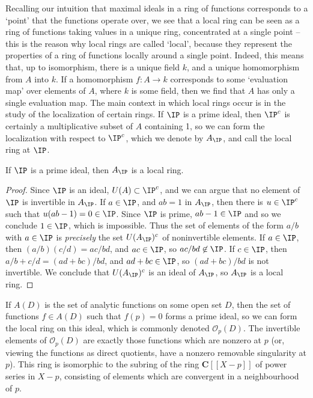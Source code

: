 Recalling our intuition that maximal ideals in a ring of functions corresponds to a `point' that the functions operate over, we see that a local ring can be seen as a ring of functions taking values in a unique ring, concentrated at a single point -- this is the reason why local rings are called `local', because they represent the properties of a ring of functions locally around a single point. Indeed, this means that, up to isomorphism, there is a unique field $k$, and a unique homomorphism from $A$ into $k$. If a homomorphism $f: A \to k$ corresponds to some `evaluation map' over elements of $A$, where $k$ is some field, then we find that $A$ has only a single evaluation map. The main context in which local rings occur is in the study of the localization of certain rings. If $\IP$ is a prime ideal, then $\IP^c$ is certainly a multiplicative subset of $A$ containing 1, so we can form the localization with respect to $\IP^c$, which we denote by $A_{\IP}$, and call the local ring at $\IP$.

\begin{theorem}
    If $\IP$ is a prime ideal, then $A_{\IP}$ is a local ring.
\end{theorem}
\begin{proof}
    Since $\IP$ is an ideal, $U(A) \subset \IP^c$, and we can argue that no element of $\IP$ is invertible in $A_{\IP}$. If $a \in \IP$, and $ab = 1$ in $A_{\IP}$, then there is $u \in \IP^c$ such that $u(ab - 1) = 0 \in \IP$. Since $\IP$ is prime, $ab - 1 \in \IP$ and so we conclude $1 \in \IP$, which is impossible. Thus the set of elements of the form $a/b$ with $a \in \IP$ is {\it precisely} the set $U(A_{\IP})^c$ of noninvertible elements. If $a \in \IP$, then $(a/b)(c/d) = ac/bd$, and $ac \in \IP$, so $ac/bd \not \in \IP$. If $c \in \IP$, then $a/b + c/d = (ad + bc)/bd$, and $ad + bc \in \IP$, so $(ad + bc)/bd$ is not invertible. We conclude that $U(A_{\IP})^c$ is an ideal of $A_{\IP}$, so $A_{\IP}$ is a local ring.
\end{proof}

\begin{example}
    If $A(D)$ is the set of analytic functions on some open set $D$, then the set of functions $f \in A(D)$ such that $f(p) = 0$ forms a prime ideal, so we can form the local ring on this ideal, which is commonly denoted $\mathcal{O}_p(D)$. The invertible elements of $\mathcal{O}_p(D)$ are exactly those functions which are nonzero at $p$ (or, viewing the functions as direct quotients, have a nonzero removable singularity at $p$). This ring is isomorphic to the subring of the ring $\mathbf{C}[[X-p]]$ of power series in $X-p$, consisting of elements which are convergent in a neighbourhood of $p$.
\end{example}

